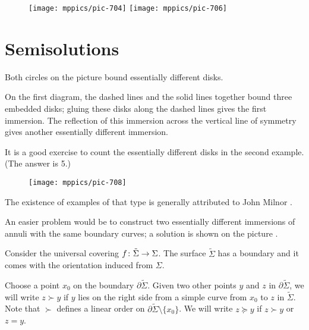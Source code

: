 {

\begin{wrapfigure}{r}{29 mm}
\vskip-4mm
\centering
\texttt{[image: mppics/pic-704]}
\bigskip
\texttt{[image: mppics/pic-706]}
\end{wrapfigure}

\section*{Semisolutions}

Both circles on the picture bound essentially different disks.



\medskip

On the first diagram, the dashed lines and the solid lines together bound three embedded disks;
gluing these disks along the dashed lines gives the first immersion.
The reflection of this immersion across the vertical line of symmetry gives another essentially different immersion.
\qeds

}


It is a good exercise to count the essentially different disks in the second example. 
(The answer is 5.) 

{

\begin{wrapfigure}{r}{30 mm}
\vskip-7mm
\centering
\texttt{[image: mppics/pic-708]}
\end{wrapfigure}

The existence of examples of that type is generally attributed to John Milnor \cite{bennequin}.

An easier problem would be to construct two essentially different immersions of annuli with the same boundary curves; a solution is shown on the picture \cite[for more details and references see][]{eppstein-mumford}.

}

Consider the universal covering 
$f\:\tilde\Sigma\z\to\Sigma$.
The surface $\tilde \Sigma$ has a boundary and it comes with the orientation induced from $\Sigma$.



Choose a point $x_0$ on the boundary $\partial \tilde \Sigma$.
Given two other points $y$ and $z$ in $\partial \tilde \Sigma$, we will write
$z\succ y$ if $y$ lies on the right side from a simple curve from $x_0$ to $z$ in $\tilde\Sigma$.
Note that  $\succ $ defines a linear order on $\partial\tilde\Sigma\setminus\{x_0\}$.
We will write $z \succeq y$ 
if $z\succ y$ or $z=y$.

